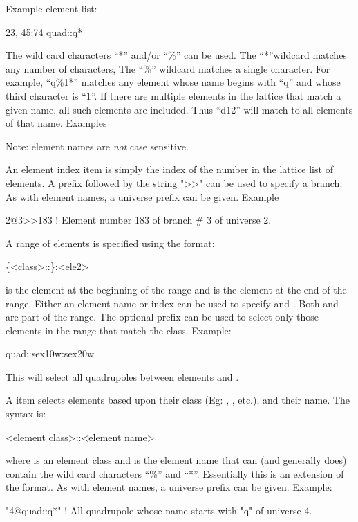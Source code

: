 Example element list:
\begin{example}
  23, 45:74 quad::q*
\end{example}

The wild card characters ``*'' and/or ``\%'' can be used. The ``*''wildcard matches any number of
characters, The ``\%'' wildcard matches a single character. For example, ``q\%1*'' matches any
element whose name begins with ``q'' and whose third character is ``1''.  If there are multiple
elements in the lattice that match a given name, all such elements are included. Thus ``d12'' will
match to all elements of that name. Examples
Note: element names are {\em not} case sensitive.

An element index item is simply the index of the number in the lattice list of elements. A prefix
followed by the string ">>" can be used to specify a branch. As with element names, a universe
prefix can be given. Example
\begin{example}
  2@3>>183   ! Element number 183 of branch \# 3 of universe 2.
\end{example}

A range of elements is specified using the format:
\begin{example}
  \{<class>::\}<ele1>:<ele2>
\end{example}
 is the element at the beginning of the range and  is the element at the end
of the range. Either an element name or index can be used to specify  and
. Both  and  are part of the range. The optional 
prefix can be used to select only those elements in the range that match the class.  Example:
\begin{example}
  quad::sex10w:sex20w
\end{example}
This will select all quadrupoles between elements  and .

A  item
selects elements based upon their class (Eg: ,
, etc.), and their name. The syntax is:
\begin{example}
  <element class>::<element name>
\end{example}
where  is an element class and  is the element name that can
(and generally does) contain the wild card characters ``\%'' and ``*''. Essentially this is an
extension of the  format. As with element names, a universe prefix can be
given. Example:
\begin{example}
  "4@quad::q*"   ! All quadrupole whose name starts with "q" of universe 4.
\end{example}

